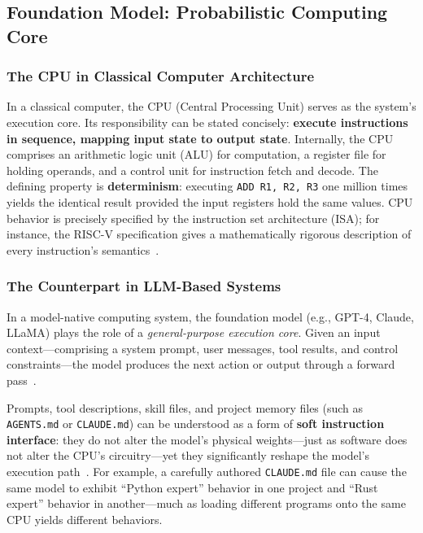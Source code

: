 \documentclass[11pt,a4paper]{article}
\begin{document}
\subsection{Foundation Model: Probabilistic Computing Core}
\label{sec:model}

\subsubsection{The CPU in Classical Computer Architecture}

In a classical computer, the CPU (Central Processing Unit) serves as the system's execution core.
Its responsibility can be stated concisely: \textbf{execute instructions in sequence, mapping input state to output state}.
Internally, the CPU comprises an arithmetic logic unit (ALU) for computation, a register file for holding operands, and a control unit for instruction fetch and decode.
The defining property is \textbf{determinism}: executing \texttt{ADD R1, R2, R3} one million times yields the identical result provided the input registers hold the same values.
CPU behavior is precisely specified by the instruction set architecture (ISA); for instance, the RISC-V specification gives a mathematically rigorous description of every instruction's semantics~\cite{riscv_spec_2026}.

\subsubsection{The Counterpart in LLM-Based Systems}

In a model-native computing system, the foundation model (e.g., GPT-4, Claude, LLaMA) plays the role of a \textit{general-purpose execution core}.
Given an input context---comprising a system prompt, user messages, tool results, and control constraints---the model produces the next action or output through a forward pass~\cite{vaswani2017attention,brown2020gpt3,llama2023}.

Prompts, tool descriptions, skill files, and project memory files (such as \texttt{AGENTS.md} or \texttt{CLAUDE.md}) can be understood as a form of \textbf{soft instruction interface}: they do not alter the model's physical weights---just as software does not alter the CPU's circuitry---yet they significantly reshape the model's execution path~\cite{openai_codex_agents_md_2026,openai_codex_skills_2026,anthropic_claudecode_memory_2026}.
For example, a carefully authored \texttt{CLAUDE.md} file can cause the same model to exhibit ``Python expert'' behavior in one project and ``Rust expert'' behavior in another---much as loading different programs onto the same CPU yields different behaviors.
\end{document}
